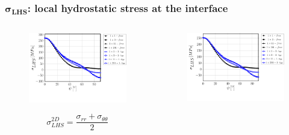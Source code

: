 \documentclass[first,firstsupp,lastsupp,last,hyperref,table]{ETHclass}
\begin{document}
\begin{frame}
\frametitle{\vspace{0.2cm}\small $\mathbf{\sigma_{LHS}}$: local hydrostatic stress at the interface}
\vspace{-.75cm}
\centering
\begin{columns}[c]
\centering
\begin{column}{0.5\textwidth}
\centering
\begin{figure}
\centering
\includegraphics[width=\columnwidth]{vf60-nodamage-p2D-notol.pdf}
\end{figure}
\vspace{-0.5cm}
\scriptsize
\begin{equation*}
\sigma^{2D}_{LHS}=\frac{\sigma_{rr}+\sigma_{\theta\theta}}{2}
\end{equation*}
\end{column}
\begin{column}{0.5\textwidth}
\centering
\begin{figure}
\centering
\includegraphics[width=\columnwidth]{vf60-nodamage-p3D-notol.pdf}

\end{figure}
\end{column}
\end{columns}
\end{frame}
\end{document}
